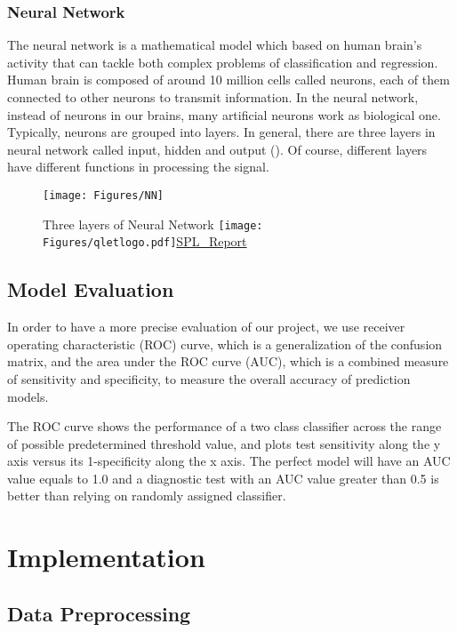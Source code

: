 \documentclass[a4paper,11pt]{article}
\begin{document}
\subsubsection{Neural Network}
The neural network is a mathematical model which based on human brain’s activity that can tackle both complex problems of classification and regression. Human brain is composed of around 10 million cells called neurons, each of them connected to other neurons to transmit information. In the neural network, instead of neurons in our brains, many artificial neurons work as biological one. 
Typically, neurons are grouped into layers. In general, there are three layers in neural network called input, hidden and output (\cite{NN97}). Of course, different layers have different functions in processing the signal.
 \begin{figure}[!ht] 
	\centering\texttt{[image: Figures/NN]} 
	\caption{Three layers of Neural Network \protect\texttt{[image: Figures/qletlogo.pdf]}\href{https://github.com/Jingmin24/R-programming/tree/master/SPL_Report}{SPL\_Report}}\label{fig:NN} 
\end{figure}

\subsection{Model Evaluation}
In order to have a more precise evaluation of our project, we use receiver operating characteristic (ROC) curve, which is a generalization of the confusion matrix, and the area under the ROC curve (AUC), which is a combined measure of sensitivity and specificity, to measure the overall accuracy of prediction models.\cite{bradley1997use}

The ROC curve shows the performance of a two class classifier across the range of possible predetermined threshold value, and plots test sensitivity along the y axis versus its 1-specificity along the x axis.\cite{park2004receiver} The perfect model will have an AUC value equals to 1.0 and a diagnostic test with an AUC value greater than 0.5 is better than relying on randomly assigned classifier.\\

\newpage
\section{Implementation}
\subsection{Data Preprocessing}
\end{document}
